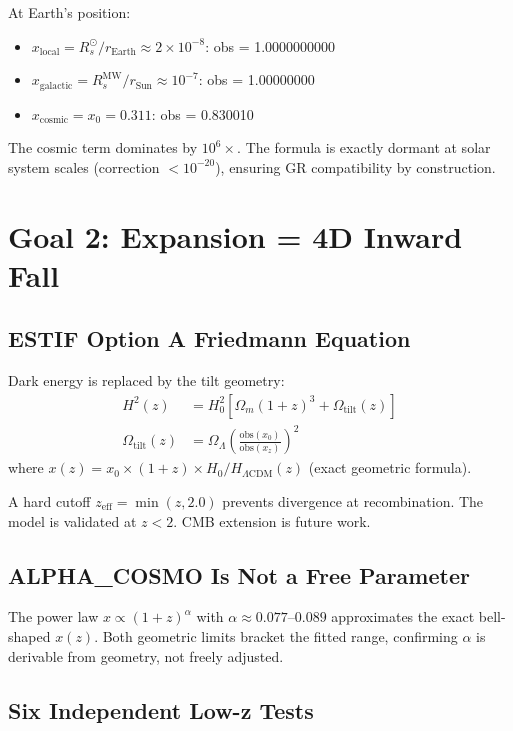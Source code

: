 \documentclass[12pt]{article}
\begin{document}
At Earth's position:
\begin{itemize}
\item $x_\text{local} = R_s^\odot / r_\text{Earth} \approx 2\times10^{-8}$: obs = 1.0000000000
\item $x_\text{galactic} = R_s^\text{MW} / r_\text{Sun} \approx 10^{-7}$: obs = 1.00000000
\item $x_\text{cosmic} = x_0 = 0.311$: obs = 0.830010
\end{itemize}

The cosmic term dominates by $10^6\times$. The formula is exactly dormant at solar system
scales (correction $< 10^{-20}$), ensuring GR compatibility by construction.

\section{Goal 2: Expansion = 4D Inward Fall}

\subsection{ESTIF Option A Friedmann Equation}

Dark energy is replaced by the tilt geometry:
\begin{align}
H^2(z) &= H_0^2 \left[\Omega_m(1+z)^3 + \Omega_\text{tilt}(z)\right] \\
\Omega_\text{tilt}(z) &= \Omega_\Lambda \left(\frac{\text{obs}(x_0)}{\text{obs}(x_z)}\right)^2
\end{align}
where $x(z) = x_0 \times (1+z) \times H_0/H_{\Lambda\text{CDM}}(z)$ (exact geometric formula).

A hard cutoff $z_\text{eff} = \min(z, 2.0)$ prevents divergence at recombination.
The model is validated at $z < 2$. CMB extension is future work.

\subsection{ALPHA\_COSMO Is Not a Free Parameter}

The power law $x \propto (1+z)^\alpha$ with $\alpha \approx 0.077$--$0.089$ approximates
the exact bell-shaped $x(z)$. Both geometric limits bracket the fitted range, confirming
$\alpha$ is derivable from geometry, not freely adjusted.

\subsection{Six Independent Low-z Tests}
\end{document}
